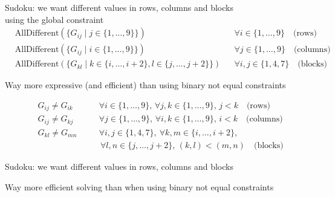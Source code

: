 \documentclass{cons-beamer}
\begin{document}
\begin{frame}
  \begin{example}
    Sudoku: we want different values in rows, columns and blocks \\
    using the  global constraint 
    \begin{align*}
      &\text{AllDifferent}(\{G_{ij} \mid j \in \{1, \ldots, 9\}\}) & & \forall i \in \{1, \ldots, 9\} \quad \text{(rows)} \\
      &\text{AllDifferent}(\{G_{ij} \mid i \in \{1, \ldots, 9\}\}) & & \forall j \in \{1, \ldots, 9\} \quad \text{(columns)} \\
      &\text{AllDifferent}(\{G_{kl} \mid k \in \{i, \ldots, i+2\}, l \in \{j, \ldots, j+2\}\}) & & \forall i, j \in \{1, 4, 7\} \quad \text{(blocks)}
    \end{align*}

    Way more expressive (and efficient) than using binary not equal constraints
    
    \begin{align*}
      &G_{ij} \neq G_{ik} & \quad & \forall i \in \{1, \ldots, 9\}, \, \forall j, k \in \{1, \ldots, 9\}, \, j < k \quad \text{(rows)} \\
      &G_{ij} \neq G_{kj} & \quad & \forall j \in \{1, \ldots, 9\}, \, \forall i, k \in \{1, \ldots, 9\}, \, i < k \quad \text{(columns)} \\
      &G_{kl} \neq G_{mn} & \quad & \forall i, j \in \{1, 4, 7\}, \ \forall k, m \in \{i, \ldots, i+2\}, \\
      & & & \, \forall l, n \in \{j, \ldots, j+2\}, \, (k, l) < (m, n) \quad \text{(blocks)}
    \end{align*}
  \end{example}
\end{frame}

\begin{flashcardcpmpy}
\begin{frame}
  \begin{example}[CPMpy]
    Sudoku: we want different values in rows, columns and blocks

    
    \vfill

    Way more efficient solving than when using binary not equal constraints
    \vfill

    
  \end{example}
\end{frame}
\end{flashcardcpmpy}
\end{document}
